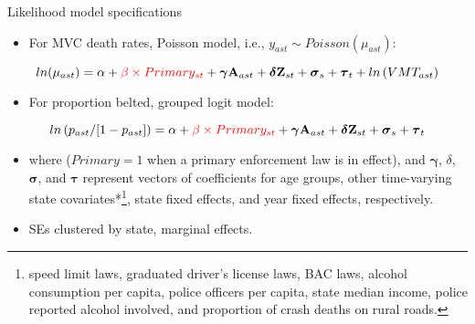 \documentclass[english]{beamer}\usepackage[]{graphicx}\usepackage[]{color}
\renewcommand\footnotesize{\fontsize{7}{7} \selectfont}
\begin{document}
\begin{frame}{Likelihood model specifications}
\begin{itemize}
\item For MVC death rates, Poisson model, i.e., $y_{ast}\sim Poisson(\mu_{ast})$:
\end{itemize}
\[
ln(\mu_{ast})=\alpha+{\color{red}\beta\times Primary_{st}}+\boldsymbol{\gamma}\mathbf{A}_{ast}+\boldsymbol{\delta}\mathbf{Z}_{st}+\boldsymbol{\sigma}_{s}+\boldsymbol{\tau}_{t}+ln\left(VMT_{ast}\right)
\]
\medskip{}

\begin{itemize}
\item For proportion belted, grouped logit model:
\end{itemize}
\[
ln\left(p_{ast}/[1-p_{ast}]\right)=\alpha+{\color{red}\beta\times Primary_{st}}+\boldsymbol{\gamma}\mathbf{A}_{ast}+\boldsymbol{\delta}\mathbf{Z}_{st}+\boldsymbol{\sigma}_{s}+\boldsymbol{\tau}_{t}
\]

\medskip{}

\begin{itemize}
\item {\small{}where ($Primary=1$ when a primary enforcement law is in
effect), and $\boldsymbol{\gamma}$, $\delta$, $\boldsymbol{\sigma}$,
and $\mathsf{\boldsymbol{\tau}}$ represent vectors of coefficients
for age groups, other time-varying state covariates{*}}\footnote{{\footnotesize{}{*}speed limit laws, graduated driver\textquoteright s
license laws, BAC laws, alcohol consumption per capita, police officers
per capita, state median income, police reported alcohol involved,
and proportion of crash deaths on rural roads.}}{\small{}, state fixed effects, and year fixed effects, respectively.}{\small \par}
\item {\small{}SEs clustered by state, marginal effects.}{\small \par}
\end{itemize}
\end{frame}
%
\end{document}
